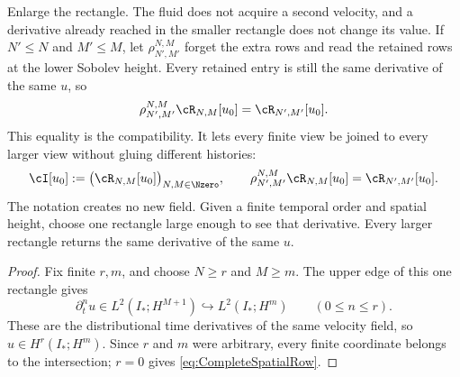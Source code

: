 Enlarge the rectangle.  The fluid does not acquire a second velocity, and a
derivative already reached in the smaller rectangle does not change its value.
If \(N'\leq N\) and \(M'\leq M\), let
\(\rho_{N',M'}^{N,M}\) forget the extra rows and read the retained rows at the
lower Sobolev height.  Every retained entry is still the same derivative of
the same \(u\), so
\begin{equation}\label{eq:BodyRectangleRestrictionCompatibility}
  \rho_{N',M'}^{N,M}\cR_{N,M}[u_0]
  =\cR_{N',M'}[u_0].
\end{equation}
This equality is the compatibility.  It lets every finite view be joined to
every larger view without gluing different histories:
\begin{equation}\label{eq:DatumSpecificCompatibleIntersection}
  \cI[u_0]
  :=\bigl(\cR_{N,M}[u_0]\bigr)_{N,M\in\Nzero},
  \qquad
  \rho_{N',M'}^{N,M}\cR_{N,M}[u_0]
  =\cR_{N',M'}[u_0].
\end{equation}
The notation creates no new field.  Given a finite temporal order and spatial
height, choose one rectangle large enough to see that derivative.  Every larger
rectangle returns the same derivative of the same \(u\).


\begin{proof}
Fix finite \(r,m\), and choose \(N\geq r\) and \(M\geq m\).
The upper edge of this one rectangle gives
\[
  \partial_t^nu\in L^2(I_*;H^{M+1})
  \hookrightarrow L^2(I_*;H^m)
  \qquad(0\leq n\leq r).
\]
These are the distributional time derivatives of the same velocity field, so
\(u\in H^r(I_*;H^m)\).  Since \(r\) and \(m\) were arbitrary, every finite
coordinate belongs to the intersection; \(r=0\) gives
\eqref{eq:CompleteSpatialRow}.
\end{proof}
